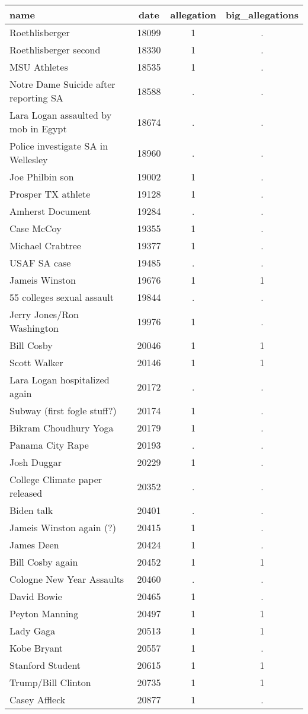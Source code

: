\documentclass[]{article}
\begin{document}
\begin{tabular}{lccc} \hline
name & date & allegation & big\_allegations \\ \hline
Roethlisberger & 18099 & 1 & . \\
Roethlisberger second & 18330 & 1 & . \\
MSU Athletes & 18535 & 1 & . \\
Notre Dame Suicide after reporting SA  & 18588 & . & . \\
Lara Logan assaulted by mob in Egypt & 18674 & . & . \\
Police investigate SA in Wellesley & 18960 & . & . \\
Joe Philbin son & 19002 & 1 & . \\
Prosper TX athlete & 19128 & 1 & . \\
Amherst Document & 19284 & . & . \\
Case McCoy & 19355 & 1 & . \\
Michael Crabtree & 19377 & 1 & . \\
USAF SA case & 19485 & . & . \\
Jameis Winston & 19676 & 1 & 1 \\
55 colleges sexual assault & 19844 & . & . \\
Jerry Jones/Ron Washington & 19976 & 1 & . \\
Bill Cosby & 20046 & 1 & 1 \\
Scott Walker & 20146 & 1 & 1 \\
Lara Logan hospitalized again & 20172 & . & . \\
Subway (first fogle stuff?) & 20174 & 1 & . \\
Bikram Choudhury Yoga & 20179 & 1 & . \\
Panama City Rape & 20193 & . & . \\
Josh Duggar & 20229 & 1 & . \\
College Climate paper released & 20352 & . & . \\
Biden talk & 20401 & . & . \\
Jameis Winston again (?) & 20415 & 1 & . \\
James Deen & 20424 & 1 & . \\
Bill Cosby again & 20452 & 1 & 1 \\
Cologne New Year Assaults & 20460 & . & . \\
David Bowie & 20465 & 1 & . \\
Peyton Manning & 20497 & 1 & 1 \\
Lady Gaga & 20513 & 1 & 1 \\
Kobe Bryant & 20557 & 1 & . \\
Stanford Student & 20615 & 1 & 1 \\
Trump/Bill Clinton & 20735 & 1 & 1 \\
 Casey Affleck & 20877 & 1 & . \\ \hline
\end{tabular}
\end{document}
